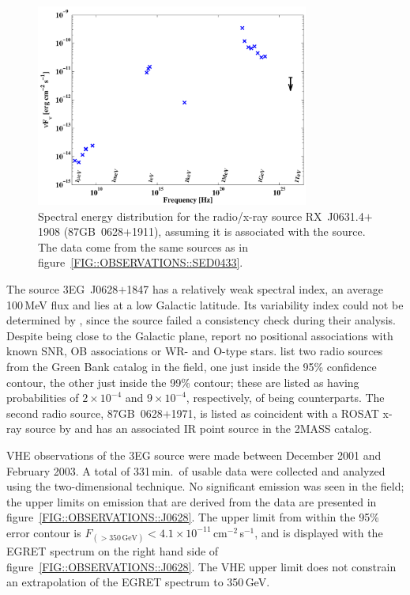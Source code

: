\begin{figure}[p]
\centerline{\includegraphics[angle=270,width=0.8\textwidth]{plots/chap-observations/sed0628.pdf}}
\caption{\label{FIG::OBSERVATIONS::SED0628} Spectral energy 
distribution for the radio/x-ray source RX~J0631.4$+$1908
(87GB~0628$+$1911), assuming it is associated with the \Gray
source. The data come from the same sources as in
figure~\ref{FIG::OBSERVATIONS::SED0433}.}
\end{figure}

The \Gray source 3EG~J0628$+$1847 has a relatively weak spectral
index, an average 100\,MeV flux and lies at a low Galactic
latitude. Its variability index could not be determined by
\citet{REF::NOLAN::APJ2003}, since the source failed a consistency
check during their analysis. Despite being close to the Galactic
plane, \citet{REF::ROMERO::AA1999} report no positional associations
with known SNR, OB associations or WR- and O-type
stars. \citet{REF::MATTOX::APJS2001} list two radio sources from the
Green Bank catalog in the field, one just inside the 95\% confidence
contour, the other just inside the 99\% contour; these are listed as
having probabilities of $2\times10^{-4}$ and $9\times10^{-4}$,
respectively, of being counterparts. The second radio source,
87GB~0628$+$1971, is listed as coincident with a ROSAT x-ray source by
\citet{REF::LAURENT_MUEHLEISEN::AAS1997} and has an associated IR 
point source in the 2MASS catalog.

VHE observations of the 3EG source were made between December 2001 and
February 2003. A total of 331\,min.\ of usable data were collected and
analyzed using the two-dimensional technique. No significant emission
was seen in the field; the upper limits on emission that are derived
from the data are presented in figure~\ref{FIG::OBSERVATIONS::J0628}.
The upper limit from within the 95\% error contour is
$F_{(>350\,\mathrm{GeV})}<4.1\times10^{-11}$\,cm$^{-2}$\,s$^{-1}$, and is
displayed with the EGRET spectrum on the right hand side of
figure~\ref{FIG::OBSERVATIONS::J0628}. The VHE upper limit does
not constrain an extrapolation of the EGRET spectrum to 350\,GeV.

